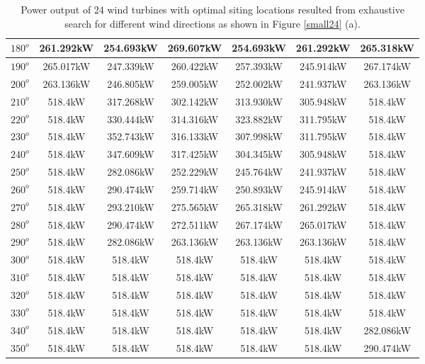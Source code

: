 \begin{table}[H]
\begin{tabular}{|c|c|c|c|c|c|c|}
		$180^o$	& 261.292kW	& 254.693kW	& 269.607kW	& 254.693kW	& 261.292kW	& 265.318kW	\\ \hline
		$190^o$	& 265.017kW	& 247.339kW	& 260.422kW	& 257.393kW	& 245.914kW	& 267.174kW	\\ \hline
		$200^o$	& 263.136kW	& 246.805kW	& 259.005kW	& 252.002kW	& 241.937kW	& 263.136kW	\\ \hline
		$210^o$	& 518.4kW	& 317.268kW	& 302.142kW	& 313.930kW	& 305.948kW	& 518.4kW	\\ \hline
		$220^o$	& 518.4kW	& 330.444kW	& 314.316kW	& 323.882kW	& 311.795kW	& 518.4kW	\\ \hline
		$230^o$	& 518.4kW	& 352.743kW	& 316.133kW	& 307.998kW	& 311.795kW	& 518.4kW	\\ \hline
		$240^o$	& 518.4kW	& 347.609kW	& 317.425kW	& 304.345kW	& 305.948kW	& 518.4kW	\\ \hline
		$250^o$	& 518.4kW	& 282.086kW	& 252.229kW	& 245.764kW	& 241.937kW	& 518.4kW	\\ \hline
		$260^o$	& 518.4kW	& 290.474kW	& 259.714kW	& 250.893kW	& 245.914kW	& 518.4kW	\\ \hline
		$270^o$	& 518.4kW	& 293.210kW	& 275.565kW	& 265.318kW	& 261.292kW	& 518.4kW	\\ \hline
		$280^o$	& 518.4kW	& 290.474kW	& 272.511kW	& 267.174kW	& 265.017kW	& 518.4kW	\\ \hline
		$290^o$	& 518.4kW	& 282.086kW	& 263.136kW	& 263.136kW	& 263.136kW	& 518.4kW	\\ \hline
		$300^o$	& 518.4kW	& 518.4kW	& 518.4kW	& 518.4kW	& 518.4kW	& 518.4kW	\\ \hline
		$310^o$	& 518.4kW	& 518.4kW	& 518.4kW	& 518.4kW	& 518.4kW	& 518.4kW	\\ \hline
		$320^o$	& 518.4kW	& 518.4kW	& 518.4kW	& 518.4kW	& 518.4kW	& 518.4kW	\\ \hline
		$330^o$	& 518.4kW	& 518.4kW	& 518.4kW	& 518.4kW	& 518.4kW	& 518.4kW	\\ \hline
		$340^o$	& 518.4kW	& 518.4kW	& 518.4kW	& 518.4kW	& 518.4kW	& 282.086kW	\\ \hline
		$350^o$	& 518.4kW	& 518.4kW	& 518.4kW	& 518.4kW	& 518.4kW	& 290.474kW	\\ \hline
        	\end{tabular}
        	\caption{Power output of 24 wind turbines with optimal siting locations resulted from exhaustive search for different wind directions as shown in Figure \ref{small24} (a).}
        	\label{table24a}
        \end{table}
